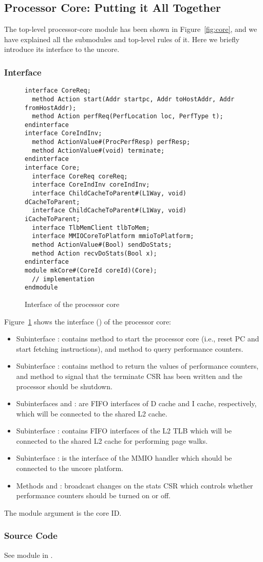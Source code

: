 \subsection{Processor Core: Putting it All Together}
The top-level processor-core module has been shown in Figure~\ref{fig:core}, and we have explained all the submodules and  top-level rules of it.
Here we briefly introduce its interface to the uncore.

\subsubsection{Interface}

\begin{figure}
\begin{lstlisting}[caption={}]
interface CoreReq;
  method Action start(Addr startpc, Addr toHostAddr, Addr fromHostAddr);
  method Action perfReq(PerfLocation loc, PerfType t);
endinterface
interface CoreIndInv;
  method ActionValue#(ProcPerfResp) perfResp;
  method ActionValue#(void) terminate;
endinterface
interface Core;
  interface CoreReq coreReq;
  interface CoreIndInv coreIndInv;
  interface ChildCacheToParent#(L1Way, void) dCacheToParent;
  interface ChildCacheToParent#(L1Way, void) iCacheToParent;
  interface TlbMemClient tlbToMem;
  interface MMIOCoreToPlatform mmioToPlatform;
  method ActionValue#(Bool) sendDoStats;
  method Action recvDoStats(Bool x);
endinterface
module mkCore#(CoreId coreId)(Core);
  // implementation
endmodule
\end{lstlisting}
\caption{Interface of the processor core}\label{fig:core-ifc}
\end{figure}

Figure~\ref{fig:core-ifc} shows the interface () of the processor core:
\begin{itemize}
    \item Subinterface : contains method  to start the processor core (i.e., reset PC and start fetching instructions), and method  to query performance counters.
    \item Subinterface : contains method  to return the values of performance counters, and method  to signal that the terminate CSR has been written and the processor should be shutdown.
    \item Subinterfaces  and : are FIFO interfaces of D cache and I cache, respectively, which will be connected to the shared L2 cache.
    \item Subinterface : contains FIFO interfaces of the L2 TLB which will be connected to the shared L2 cache for performing page walks.
    \item Subinterface : is the interface of the MMIO handler which should be connected to the uncore platform.
    \item Methods  and : broadcast changes on the stats CSR which controls whether performance counters should be turned on or off.
\end{itemize}
The module argument  is the core ID.

\subsubsection{Source Code}
See module  in .
